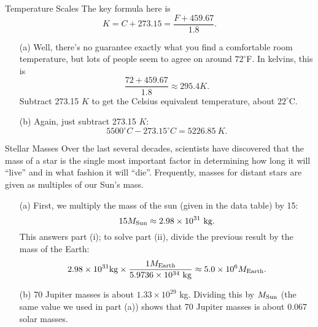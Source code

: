 \documentclass[12pt]{article}
\begin{document}
\begin{probdesc}{3}{Temperature Scales}
The key formula here is
\begin{equation}
K = C + 273.15 = \frac{F + 459.67}{1.8}.
\end{equation}

\begin{enumerate}
\item[(a)] Well, there's no guarantee exactly what you find a
  comfortable room temperature, but lots of people seem to agree on
  around $72^\circ$F.  In kelvins, this is
\begin{equation}
\frac{72 + 459.67}{1.8} \approx 295.4 K.
\end{equation}
Subtract 273.15 $K$ to get the Celsius equivalent temperature, about
$22^\circ$C.

\item[(b)] Again, just subtract 273.15 $K$:
\begin{equation}
5500^\circ C - 273.15^\circ C = 5226.85\ K.
\end{equation}
\end{enumerate}

\end{probdesc}

\begin{probdesc}{4}{Stellar Masses}
Over the last several decades, scientists have discovered that the
mass of a star is the single most important factor in determining how
long it will ``live'' and in what fashion it will ``die''.
Frequently, masses for distant stars are given as multiples of our
Sun's mass.

\begin{enumerate}
\item[(a)] First, we multiply the mass of the sun (given in the data
  table) by 15:
\begin{equation}
15 M_{\rm Sun} \approx 2.98 \times 10^{31} {\rm\ kg}.
\end{equation}
This answers part (i); to solve part (ii), divide the previous result
by the mass of the Earth:
\begin{equation}
2.98\times 10^{31} {\rm kg} \times
\frac{1 M_{\rm Earth}}{5.9736\times10^{34} \rm\ kg}
\approx 5.0\times10^6 M_{\rm Earth}.
\end{equation}

\item[(b)] 70 Jupiter masses is about $1.33\times10^{29}$ kg.  Dividing
  this by $M_{\rm Sun}$ (the same value we used in part (a)) shows that
  70 Jupiter masses is about 0.067 solar masses.
\end{enumerate}
\end{probdesc}
\end{document}
